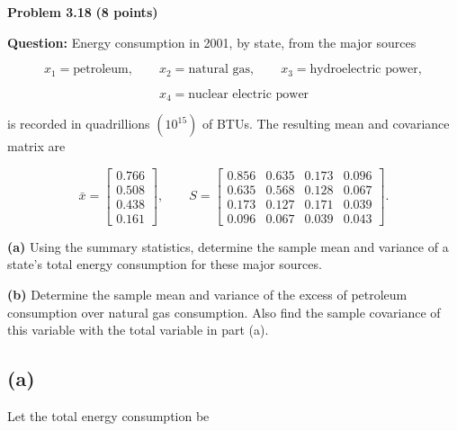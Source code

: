 \documentclass{article}
\begin{document}
\newpage

\noindent
{\Large \textbf{Problem 3.18}}
\hfill
{\large \textbf{(8 points)}}

\vspace{0.3cm}

\noindent
\textbf{Question:} Energy consumption in 2001, by state, from the
major sources

$$
x_1=\text{petroleum},\qquad
x_2=\text{natural gas},\qquad
x_3=\text{hydroelectric power},
$$

$$
x_4=\text{nuclear electric power}
$$

\noindent
is recorded in quadrillions $(10^{15})$ of BTUs. The resulting mean
and covariance matrix are

$$
\bar{x}
=
\begin{bmatrix}
0.766\\
0.508\\
0.438\\
0.161
\end{bmatrix},
\qquad
S=
\begin{bmatrix}
0.856&0.635&0.173&0.096\\
0.635&0.568&0.128&0.067\\
0.173&0.127&0.171&0.039\\
0.096&0.067&0.039&0.043
\end{bmatrix}.
$$

\vspace{0.2cm}

\noindent
\textbf{(a)} Using the summary statistics, determine the sample mean
and variance of a state's total energy consumption for these major
sources.

\vspace{0.2cm}

\noindent
\textbf{(b)} Determine the sample mean and variance of the excess of
petroleum consumption over natural gas consumption. Also find the
sample covariance of this variable with the total variable in part
(a).

\vspace{0.5cm}


\subsection*{(a)}

Let the total energy consumption be
\end{document}
